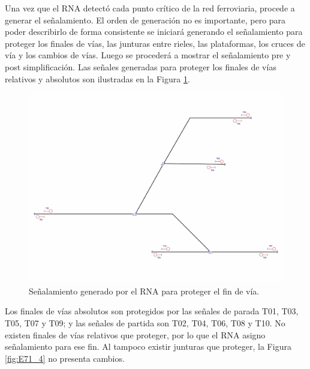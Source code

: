 	Una vez que el RNA detectó cada punto crítico de la red ferroviaria, procede a generar el señalamiento. El orden de generación no es importante, pero para poder describirlo de forma consistente se iniciará generando el señalamiento para proteger los finales de vías, las junturas entre rieles, las plataformas, los cruces de vía y los cambios de vías. Luego se procederá a mostrar el señalamiento pre y post simplificación. Las señales generadas para proteger los finales de vías relativos y absolutos son ilustradas en la Figura \ref{fig:EJ7_3}.
	
	\begin{figure}[H]
		\centering
		\includegraphics[width=1\textwidth]{resultados-obtenidos/ejemplo7/images/7_step1.png}
		\centering\caption{Señalamiento generado por el RNA para proteger el fin de vía.}
		\label{fig:EJ7_3}
	\end{figure}
	
	Los finales de vías absolutos son protegidos por las señales de parada T01, T03, T05, T07 y T09; y las señales de partida son T02, T04, T06, T08 y T10. No existen finales de vías relativos que proteger, por lo que el RNA asigno señalamiento para ese fin. Al tampoco existir junturas que proteger, la Figura \ref{fig:E71_4} no presenta cambios.
	
